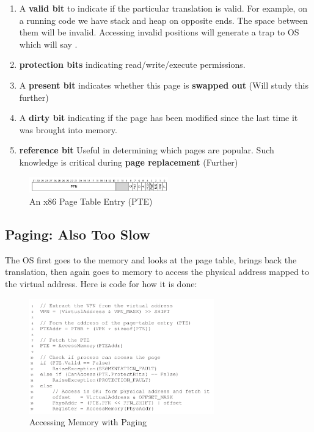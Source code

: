 \begin{enumerate}
    \item A \textbf{valid bit} to indicate if the particular translation is
        valid. For example, on a running code we have stack and heap on 
        opposite ends. The space between them will be invalid. Accessing 
        invalid positions will generate a trap to OS which will say
        .
    \item \textbf{protection bits} indicating read/write/execute permissions.
    \item A \textbf{present bit} indicates whether this page is \textbf{swapped
        out} (Will study this further)
    \item A \textbf{dirty bit} indicating if the page has been modified since
        the last time it was brought into memory.
    \item \textbf{reference bit} Useful in determining which pages are popular.
        Such knowledge is critical during \textbf{page replacement} (Further)
\end{enumerate}

\begin{figure}[h!]
    \begin{center}
        \includegraphics[width=6cm]{img/185.png}
        \caption{An x86 Page Table Entry (PTE)}
    \end{center}
\end{figure}

\subsection{Paging: Also Too Slow} 

The OS first goes to the memory and looks at the page table, brings back the 
translation, then again goes to memory to access the physical address mapped
to the virtual address. Here is code for how it is done:

\begin{figure}[h!]
    \begin{center}
        \includegraphics[width=8cm]{img/186.png}
        \caption{Accessing Memory with Paging}
    \end{center}
\end{figure}

